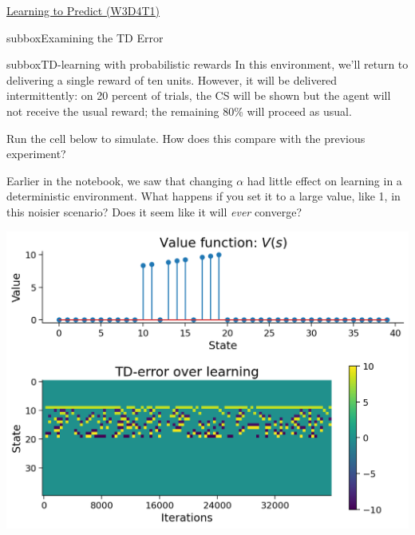 \begin{textbox}{\href{https://compneuro.neuromatch.io/tutorials/W3D4_ReinforcementLearning/student/W3D4_Tutorial1.html}{Learning to Predict (W3D4T1)} }
\begin{subbox}{subbox}{Examining the TD Error}
\end{subbox}


\begin{subbox}{subbox}{TD-learning with probabilistic rewards}
\scriptsize
In this environment, we'll return to delivering a single reward of ten units. However, it will be delivered intermittently: on 20 percent of trials, the CS will be shown but the agent will not receive the usual reward; the remaining 80\% will proceed as usual.

 Run the cell below to simulate. How does this compare with the previous experiment?

Earlier in the notebook, we saw that changing $\alpha$ had little effect on learning in a deterministic environment. What happens if you set it to a large value, like 1, in this noisier scenario? Does it seem like it will \textit{ever} converge?
\begin{center}
    
\includegraphics[scale=0.2]{Figures/RL/RL_Figure6.png}
\end{center}

\end{subbox}
\end{textbox}
